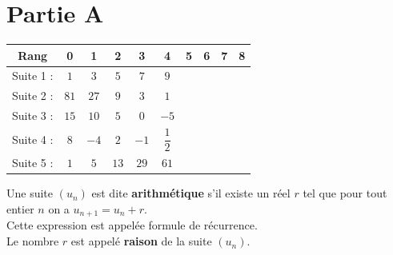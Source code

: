 \documentclass[a4paper,11pt,exos]{nsi} %
\begin{document}
\maketitle
\section*{Partie A}

\renewcommand{\arraystretch}{1.8}
\begin{tabular}{|c|c|c|c|c|c|c|c|c|c|}
	\hline
	\rowcolor{UGLiOrange}Rang & \hspace{0.5cm}0\hspace{0.5cm} & \hspace{0.5cm}1\hspace{0.5cm} & \hspace{0.5cm}2\hspace{0.5cm} & \hspace{0.5cm}3\hspace{0.5cm} & \hspace{0.5cm}4\hspace{0.5cm} & \hspace{0.5cm}5\hspace{0.5cm} & \hspace{0.5cm}6\hspace{0.5cm} & \hspace{0.5cm}7\hspace{0.5cm} & \hspace{0.5cm}8\hspace{0.5cm}  \\
	\hline
	\cellcolor{UGLiOrange}Suite 1 : & $1$ & $3$ & $5$ & $7$ & $9$ & & & & \\
	\hline
	\cellcolor{UGLiOrange}Suite 2 : & $81$ & $27$ & $9$ & $3$ & $1$ & & & & \\
	\hline
	\cellcolor{UGLiOrange}Suite 3 : & $15$ & $10$ & $5$ & $0$ & $-5$ & & & & \\
	\hline
	\cellcolor{UGLiOrange}Suite 4 : & $8$ & $-4$ & $2$ & $-1$ & $\dfrac{1}{2}$ & & & & \\
	\hline
	\cellcolor{UGLiOrange}Suite 5 : & $1$ & $5$ & $13$ & $29$ & $61$ & & & & \\
	\hline
\end{tabular}

\vspace{.5cm}
\begin{definition}[]
	Une suite $(u_n)$ est dite \textbf{arithmétique} s'il existe un réel $r$ tel que pour tout entier $n$ on a  $u_{n+1}=u_n+r$.\\
	Cette expression est appelée formule de récurrence.\\
	Le nombre $r$ est appelé \textbf{raison} de la suite $(u_n)$.
\end{definition}
\end{document}
